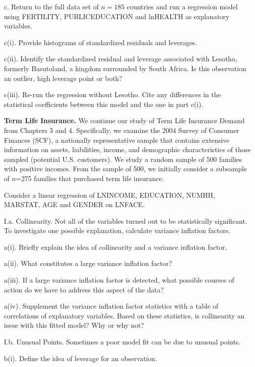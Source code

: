 \begin{exercises}
c. Return to the full data set of $n=185$ countries and run a
regression model using FERTILITY, PUBLICEDUCATION and lnHEALTH as
explanatory variables.

c(i). Provide histograms of standardized residuals and leverages.

c(ii). Identify the standardized residual and leverage associated
with Lesotho, formerly Basutoland, a kingdom surrounded by South
Africa. Is this observation an outlier, high leverage point or both?

c(iii). Re-run the regression without Lesotho. Cite any differences
in the statistical coefficients between this model and the one in
part c(i).



\item \textbf{Term Life Insurance.} We
continue our study of Term Life Insurance Demand from Chapters 3 and
4. Specifically, we examine the 2004 Survey of Consumer Finances
(SCF), a nationally representative sample that contains extensive
information on assets, liabilities, income, and demographic
characteristics of those sampled (potential U.S. customers). We
study a random sample of 500 families with positive incomes. From
the sample of 500, we initially consider a subsample of $n$=275
families that purchased term life insurance.

Consider a linear regression of LNINCOME, EDUCATION, NUMHH, MARSTAT,
AGE and GENDER on LNFACE.


I.a. Collinearity. Not all of the variables turned out to be
statistically significant. To investigate one possible explanation,
calculate variance inflation factors.

a(i). Briefly explain the idea of collinearity and a variance
inflation factor.

a(ii). What constitutes a large variance inflation factor?

a(iii). If a large variance inflation factor is detected, what
possible courses of action do we have to address this aspect of the
data?

a(iv). Supplement the variance inflation factor statistics with a
table of correlations of explanatory variables.  Based on these
statistics, is collinearity an issue with this fitted model? Why or
why not?


I.b. Unusual Points. Sometimes a poor model fit can be due to
unusual points.

b(i). Define the idea of leverage for an observation.


\end{exercises}
